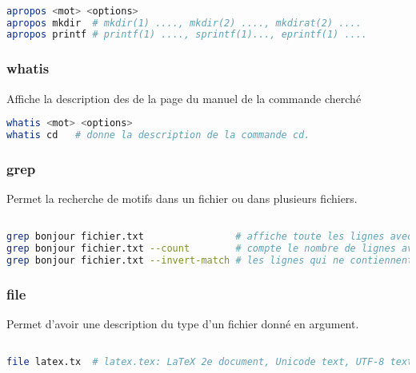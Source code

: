 \documentclass{article}
\begin{document}
\begin{lstlisting}[language=bash]

apropos <mot> <options>
apropos mkdir  # mkdir(1) ...., mkdir(2) ...., mkdirat(2) ....
apropos printf # printf(1) ...., sprintf(1)..., eprintf(1) ....

\end{lstlisting}

\subsubsection{whatis}
Affiche la description des de la page du manuel de la commande cherché

\begin{lstlisting}[language=bash]
whatis <mot> <options>
whatis cd   # donne la description de la commande cd.
\end{lstlisting}

\subsubsection{grep}
Permet la recherche de motifs dans un fichier ou dans plusieurs fichiers.

\begin{lstlisting}[language=bash]

grep bonjour fichier.txt                # affiche toute les lignes avec le mot bonjour
grep bonjour fichier.txt --count        # compte le nombre de lignes avec le mot bonjour
grep bonjour fichier.txt --invert-match # les lignes qui ne contiennent pas le mot bonjour

\end{lstlisting}

\subsubsection{file}
Permet d'avoir une description du type d'un fichier donné en argument.


\begin{lstlisting}[language=bash]

file latex.tx  # latex.tex: LaTeX 2e document, Unicode text, UTF-8 text

\end{lstlisting}
\end{document}
